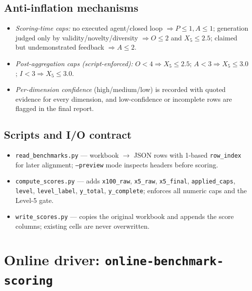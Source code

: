 \documentclass[11pt,a4paper]{article}
\begin{document}
\subsection{Anti-inflation mechanisms}
\begin{itemize}[leftmargin=1.6em,itemsep=1pt,topsep=2pt]
  \item \emph{Scoring-time caps:} no executed agent/closed loop $\Rightarrow
    P\leq 1, A\leq 1$; generation judged only by validity/novelty/diversity
    $\Rightarrow O\leq 2$ and $X_5\leq 2.5$; claimed but undemonstrated
    feedback $\Rightarrow A\leq 2$.
  \item \emph{Post-aggregation caps (script-enforced):} $O<4 \Rightarrow
    X_5\leq 2.5$; $A<3 \Rightarrow X_5\leq 3.0$; $I<3 \Rightarrow X_5\leq 3.0$.
  \item \emph{Per-dimension confidence} (high/medium/low) is recorded with
    quoted evidence for every dimension, and low-confidence or incomplete rows
    are flagged in the final report.
\end{itemize}

\subsection{Scripts and I/O contract}
\begin{itemize}[leftmargin=1.6em,itemsep=1pt,topsep=2pt]
  \item \texttt{read\_benchmarks.py} --- workbook $\rightarrow$ JSON rows with
    1-based \texttt{row\_index} for later alignment; \texttt{--preview} mode
    inspects headers before scoring.
  \item \texttt{compute\_scores.py} --- adds \texttt{x100\_raw},
    \texttt{x5\_raw}, \texttt{x5\_final}, \texttt{applied\_caps},
    \texttt{level}, \texttt{level\_label}, \texttt{y\_total},
    \texttt{y\_complete}; enforces all numeric caps and the Level-5 gate.
  \item \texttt{write\_scores.py} --- copies the original workbook and appends
    the score columns; existing cells are never overwritten.
\end{itemize}

\section{Online driver: \texttt{online-benchmark-scoring}}
\end{document}
